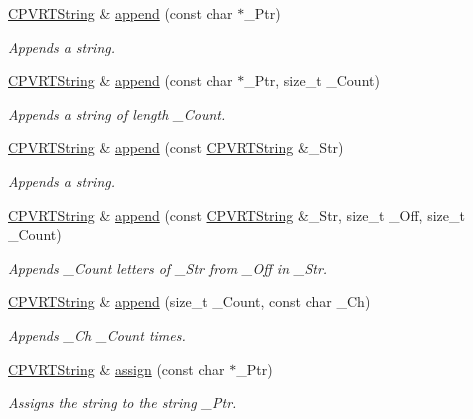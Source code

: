 \begin{DoxyCompactItemize}
\hyperlink{class_c_p_v_r_t_string}{C\+P\+V\+R\+T\+String} \& \hyperlink{class_c_p_v_r_t_string_a78f7b9163685822b1c31b08649e7af68}{append} (const char $\ast$\+\_\+\+Ptr)
\begin{DoxyCompactList}\small\item\em Appends a string. \end{DoxyCompactList}\item 
\hyperlink{class_c_p_v_r_t_string}{C\+P\+V\+R\+T\+String} \& \hyperlink{class_c_p_v_r_t_string_a5d447c118388e7875d53e34506d0b3bf}{append} (const char $\ast$\+\_\+\+Ptr, size\+\_\+t \+\_\+\+Count)
\begin{DoxyCompactList}\small\item\em Appends a string of length \+\_\+\+Count. \end{DoxyCompactList}\item 
\hyperlink{class_c_p_v_r_t_string}{C\+P\+V\+R\+T\+String} \& \hyperlink{class_c_p_v_r_t_string_a327278a567768aa9e4964e34ca1e473b}{append} (const \hyperlink{class_c_p_v_r_t_string}{C\+P\+V\+R\+T\+String} \&\+\_\+\+Str)
\begin{DoxyCompactList}\small\item\em Appends a string. \end{DoxyCompactList}\item 
\hyperlink{class_c_p_v_r_t_string}{C\+P\+V\+R\+T\+String} \& \hyperlink{class_c_p_v_r_t_string_a43fd07cd63b7ca3cfcb91a2d40d7eb60}{append} (const \hyperlink{class_c_p_v_r_t_string}{C\+P\+V\+R\+T\+String} \&\+\_\+\+Str, size\+\_\+t \+\_\+\+Off, size\+\_\+t \+\_\+\+Count)
\begin{DoxyCompactList}\small\item\em Appends \+\_\+\+Count letters of \+\_\+\+Str from \+\_\+\+Off in \+\_\+\+Str. \end{DoxyCompactList}\item 
\hyperlink{class_c_p_v_r_t_string}{C\+P\+V\+R\+T\+String} \& \hyperlink{class_c_p_v_r_t_string_af806f928176168720c218de8c494e360}{append} (size\+\_\+t \+\_\+\+Count, const char \+\_\+\+Ch)
\begin{DoxyCompactList}\small\item\em Appends \+\_\+\+Ch \+\_\+\+Count times. \end{DoxyCompactList}\item 
\hyperlink{class_c_p_v_r_t_string}{C\+P\+V\+R\+T\+String} \& \hyperlink{class_c_p_v_r_t_string_ada0fed209f3ddcb45cde07eff41b718a}{assign} (const char $\ast$\+\_\+\+Ptr)
\begin{DoxyCompactList}\small\item\em Assigns the string to the string \+\_\+\+Ptr. \end{DoxyCompactList}\item 

\end{DoxyCompactItemize}
